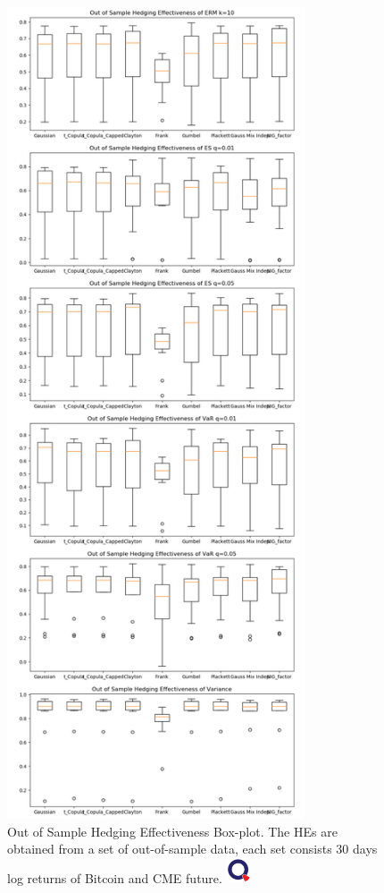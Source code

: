 
\begin{figure}[H]
   \centering
   \includegraphics[height=24cm]{_pics/Out of Sample Hedging Effectiveness.png}
   \caption{Out of Sample Hedging Effectiveness Box-plot.
   The HEs are obtained from a set of out-of-sample data,
   each set consists 30 days log returns of Bitcoin and CME future.
   \href{http://www.quantlet.com/}{\includegraphics[width=20pt]{_pics/qletlogo_tr.png}}}
   \label{fig:OOSHE}
\end{figure}

